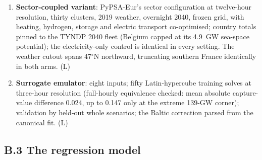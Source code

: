 \begin{enumerate}
    buildouts; exposure slopes computed over every offshore zone, with
    basin aggregates excluding GB and NO.
    \item \textbf{Sector-coupled variant}: PyPSA-Eur's sector
    configuration at twelve-hour resolution, thirty clusters, 2019 weather,
    overnight 2040, frozen grid, with heating, hydrogen, storage and
    electric transport co-optimised; country totals pinned to the TYNDP
    2040 fleet (Belgium capped at its 4.9~GW sea-space potential); the
    electricity-only control is identical in every setting. The weather
    cutout spans 47$^{\circ}$N northward, truncating southern France
    identically in both arms. (L)
    \item \textbf{Surrogate emulator}: eight inputs; fifty Latin-hypercube
    training solves at three-hour resolution (full-hourly equivalence
    checked: mean absolute capture-value difference 0.024, up to 0.147
    only at the extreme 139-GW corner); validation by held-out whole
    scenarios; the Baltic correction parsed from the canonical fit. (L)
\end{enumerate}

\subsection*{B.3 The regression model}


